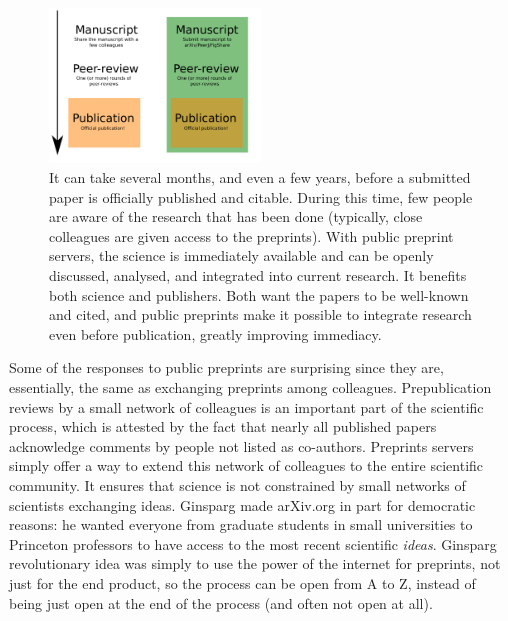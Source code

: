 \documentclass[letterpaper,twocolumn,superscriptaddress,showkeys]{revtex4}
\begin{document}
\begin{figure}[ht!] \centering\includegraphics[width=0.50\textwidth]{map.pdf}
\caption { It can take several months, and even a few years, before a submitted
paper is officially published and citable. During this time, few people are
aware of the research that has been done (typically, close colleagues are
given access to the preprints). With public preprint servers, the science is
immediately available and can be openly discussed, analysed, and integrated
into current research. It benefits both science and publishers. Both want the
papers to be well-known and cited, and public preprints make it possible to
integrate research even before publication, greatly improving immediacy.  }
\label{fig:map}
\end{figure}

Some of the responses to public preprints are surprising since they are,
essentially, the same as exchanging preprints among colleagues.
Prepublication reviews by a small network of colleagues is an important part
of the scientific process, which is attested by the fact that nearly all
published papers acknowledge comments by people not listed as co-authors.
Preprints servers simply offer a way to extend this network of colleagues to
the entire scientific community. It ensures that science is not constrained by
small networks of scientists exchanging ideas. Ginsparg made arXiv.org in part
for democratic reasons: he wanted everyone from graduate students in small
universities to Princeton professors to have access to the most recent
scientific \emph{ideas}.
Ginsparg revolutionary idea was simply to use the power of the internet for
preprints, not just for the end product, so the process can be open from A to
Z, instead of being just open at the end of the process (and often not open at
all).
\end{document}
